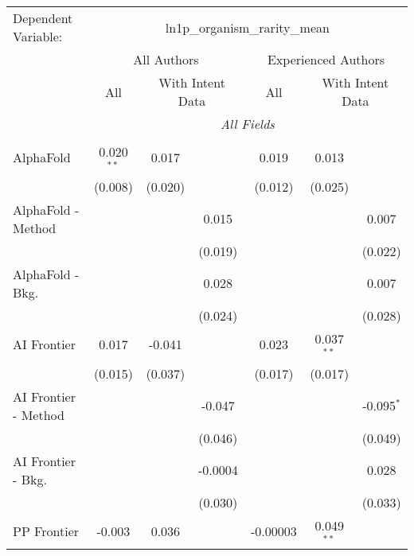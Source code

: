 \begingroup
\centering
\begin{tabular}{lcccccc}
   \tabularnewline \midrule \midrule
   Dependent Variable: & \multicolumn{6}{c}{ln1p\_organism\_rarity\_mean}\\
 & \multicolumn{3}{c}{All Authors} & \multicolumn{3}{c}{Experienced Authors} \\
\cmidrule(lr){2-4} \cmidrule(lr){5-7}
 & \multicolumn{1}{c}{All} & \multicolumn{2}{c}{With Intent Data} & \multicolumn{1}{c}{All} & \multicolumn{2}{c}{With Intent Data} \\
\cmidrule(lr){2-2} \cmidrule(lr){3-4} \cmidrule(lr){5-5} \cmidrule(lr){6-7}
 & \multicolumn{6}{c}{\textit{All Fields}} \\ \\
   AlphaFold            & 0.020$^{**}$ & 0.017   &             & 0.019    & 0.013        &   \\   
                        & (0.008)      & (0.020) &             & (0.012)  & (0.025)      &   \\   
   AlphaFold - Method   &              &         & 0.015       &          &              & 0.007\\   
                        &              &         & (0.019)     &          &              & (0.022)\\   
   AlphaFold - Bkg.     &              &         & 0.028       &          &              & 0.007\\   
                        &              &         & (0.024)     &          &              & (0.028)\\   
   AI Frontier          & 0.017        & -0.041  &             & 0.023    & 0.037$^{**}$ &   \\   
                        & (0.015)      & (0.037) &             & (0.017)  & (0.017)      &   \\   
   AI Frontier - Method &              &         & -0.047      &          &              & -0.095$^{*}$\\   
                        &              &         & (0.046)     &          &              & (0.049)\\   
   AI Frontier - Bkg.   &              &         & -0.0004     &          &              & 0.028\\   
                        &              &         & (0.030)     &          &              & (0.033)\\   
   PP Frontier          & -0.003       & 0.036   &             & -0.00003 & 0.049$^{**}$ &   \\   

\end{tabular}
